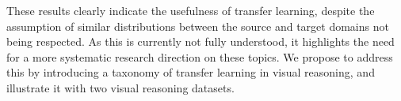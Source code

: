 These results clearly indicate the usefulness of transfer learning, despite the assumption of similar distributions between the source and target domains not being respected. As this is currently not fully understood, it highlights the need for a more systematic research direction on these topics.
We propose to address this by introducing a taxonomy of transfer learning in visual reasoning, and illustrate it with two visual reasoning datasets.

%
%
